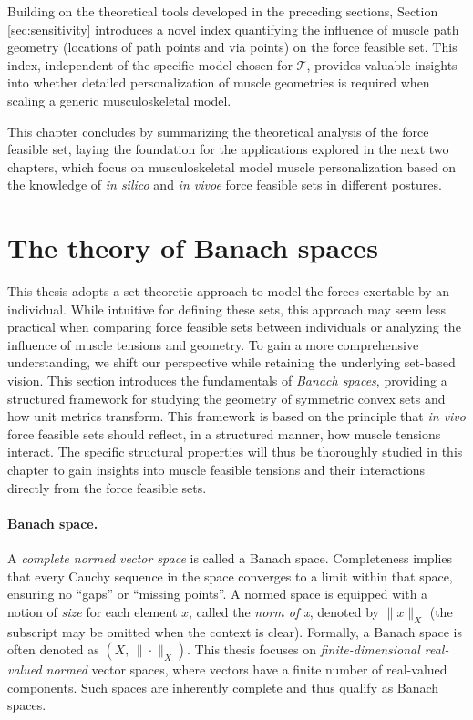 Building on the theoretical tools developed in the preceding sections, Section \ref{sec:sensitivity} introduces a novel index quantifying the influence of muscle path geometry (locations of path points and via points) on the force feasible set. This index, independent of the specific model chosen for $\mathcal{T}$, provides valuable insights into whether detailed personalization of muscle geometries is required when scaling a generic musculoskeletal model.

This chapter concludes by summarizing the theoretical analysis of the force feasible set, laying the foundation for the applications explored in the next two chapters, which focus on musculoskeletal model muscle personalization based on the knowledge of \emph{in silico} and \emph{in vivoe} force feasible sets in different postures.

\section{The theory of Banach spaces}
\label{sec:theory_banach_spaces}
This thesis adopts a set-theoretic approach to model the forces exertable by an individual. While intuitive for defining these sets, this approach may seem less practical when comparing force feasible sets between individuals or analyzing the influence of muscle tensions and geometry. To gain a more comprehensive understanding, we shift our perspective while retaining the underlying set-based vision. This section introduces the fundamentals of \emph{Banach spaces}, providing a structured framework for studying the geometry of symmetric convex sets and how unit metrics transform. This framework is based on the principle that \emph{in vivo} force feasible sets should reflect, in a structured manner, how muscle tensions interact. The specific structural properties will thus be thoroughly studied in this chapter to gain insights into muscle feasible tensions and their interactions directly from the force feasible sets.

\paragraph*{Banach space.} A \emph{complete normed vector space} is called a Banach space.  Completeness implies that every Cauchy sequence in the space converges to a limit within that space, ensuring no ``gaps'' or ``missing points''.  A normed space is equipped with a notion of \emph{size} for each element $x$, called the \emph{norm of x}, denoted by $\|x\|_X$ (the subscript may be omitted when the context is clear). Formally, a Banach space is often denoted as $(X,\, \|\cdot \|_X)$. This thesis focuses on \emph{finite-dimensional real-valued normed} vector spaces, where vectors have a finite number of real-valued components.  Such spaces are inherently complete and thus qualify as Banach spaces.


